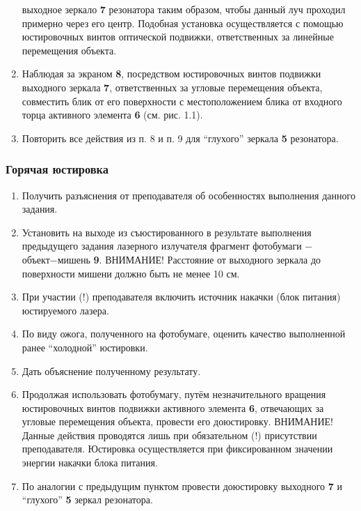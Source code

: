 \documentclass[twocolumn]{article}
\begin{document}
\begin{enumerate}
  выходное зеркало \textbf{7} резонатора таким образом, чтобы данный луч
  проходил примерно через его центр. Подобная установка осуществляется с
  помощью юстировочных винтов оптической подвижки, ответственных за
  линейные перемещения объекта.
\item
  Наблюдая за экраном \textbf{8}, посредством юстировочных винтов
  подвижки выходного зеркала \textbf{7}, ответственных за угловые
  перемещения объекта, совместить блик от его поверхности с
  местоположением блика от входного торца активного элемента \textbf{6}
  (см. рис. 1.1).
\item
  Повторить все действия из п. 8 и п. 9 для ``глухого'' зеркала
  \textbf{5} резонатора.
\end{enumerate}\subsubsection{Горячая юстировка}\begin{enumerate}
\def\labelenumi{\arabic{enumi}.}
\itemsep1pt\parskip0pt
\item
  Получить разъяснения от преподавателя об особенностях выполнения
  данного задания.
\item
  Установить на выходе из съюстированного в результате выполнения
  предыдущего задания лазерного излучателя фрагмент фотобумаги −
  объект−мишень \textbf{9}. ВНИМАНИЕ! Расстояние от выходного зеркала до
  поверхности мишени должно быть не менее 10 см.
\item
  При участии (!) преподавателя включить источник накачки (блок питания)
  юстируемого лазера.
\item
  По виду ожога, полученного на фотобумаге, оценить качество выполненной
  ранее ``холодной'' юстировки.
\item
  Дать объяснение полученному результату.
\item
  Продолжая использовать фотобумагу, путём незначительного вращения
  юстировочных винтов подвижки активного элемента \textbf{6}, отвечающих
  за угловые перемещения объекта, провести его доюстировку. ВНИМАНИЕ!
  Данные действия проводятся лишь при обязательном (!) присутствии
  преподавателя. Юстировка осуществляется при фиксированном значении
  энергии накачки блока питания.
\item
  По аналогии с предыдущим пунктом провести доюстировку выходного
  \textbf{7} и ``глухого'' \textbf{5} зеркал резонатора.
\end{enumerate}

 
         
\end{document}
